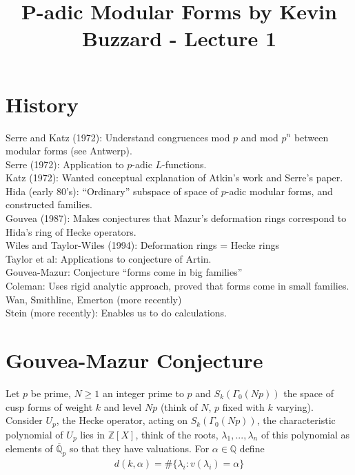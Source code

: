 \documentclass[11pt]{amsart}
\begin{document}
\title{P-adic Modular Forms by Kevin Buzzard - Lecture 1}

\maketitle

\newtheorem{lem}{Lemma}
\newtheorem{defn}{Definition}
\newtheorem{conj}{Conjecture}

\section{History}

\medskip
\noindent
Serre and Katz (1972):
Understand congruences mod $p$ and mod $p^n$ between modular forms
(see Antwerp).\\
Serre (1972):
Application to $p$-adic $L$-functions.\\
Katz (1972):
Wanted conceptual explanation of Atkin's work and Serre's paper.\\
Hida (early 80's):
``Ordinary'' subspace of space of $p$-adic modular forms, and
constructed families.\\
Gouvea (1987):
Makes conjectures that Mazur's deformation rings correspond to Hida's
ring of Hecke operators.\\
Wiles and Taylor-Wiles (1994):
Deformation rings = Hecke rings\\
Taylor et al:
Applications to conjecture of Artin.\\
Gouvea-Mazur:
Conjecture ``forms come in big families''\\
Coleman:
Uses rigid analytic approach, proved that forms come in small
families.\\
Wan, Smithline, Emerton (more recently)\\
Stein (more recently):
Enables us to do calculations.

\medskip

\section{Gouvea-Mazur Conjecture}

Let $p$ be prime, $N\geq 1$ an integer prime to $p$ and
$S_k(\Gamma_0(Np))$ the space of cusp forms of weight $k$ and level $Np$
(think of $N$, $p$ fixed with $k$ varying). Consider $U_p$, the Hecke
operator, acting on $S_k(\Gamma_0(Np))$, the characteristic
polynomial of $U_p$ lies in $\mathbb Z[X]$, think of the roots,
$\lambda_1,...,\lambda_n$ of this polynomial as elements of
$\overline{\mathbb Q}_p$ so that they
have valuations. For $\alpha\in\mathbb Q$ define
\begin{align*}
d(k,\alpha) = \#\{\lambda_i : v(\lambda_i)=\alpha \}
\end{align*}
\end{document}
